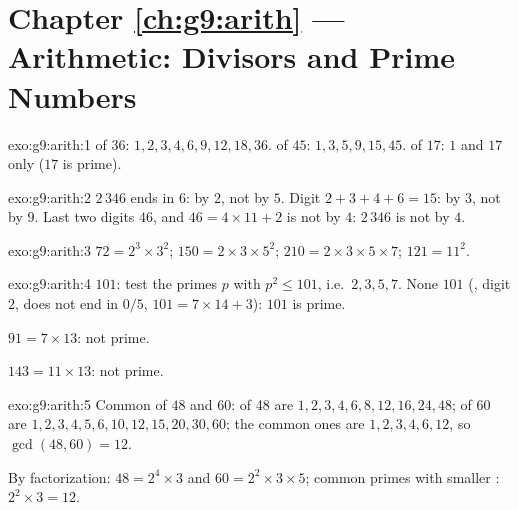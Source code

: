 \section*{Chapter \ref{ch:g9:arith} --- Arithmetic: Divisors and Prime Numbers}

\begin{solution}{exo:g9:arith:1}
 of $36$: $1, 2, 3, 4, 6, 9, 12, 18, 36$.
 of $45$: $1, 3, 5, 9, 15, 45$.
 of $17$: $1$ and $17$ only ($17$ is prime).
\end{solution}

\begin{solution}{exo:g9:arith:2}
$2\,346$ ends in $6$:  by $2$, not by $5$. Digit 
$2 + 3 + 4 + 6 = 15$:  by $3$, not by $9$. Last two digits
$46$, and $46 = 4 \times 11 + 2$ is not  by $4$: $2\,346$ is
not  by $4$.
\end{solution}

\begin{solution}{exo:g9:arith:3}
$72 = 2^3 \times 3^2$; \quad
$150 = 2 \times 3 \times 5^2$; \quad
$210 = 2 \times 3 \times 5 \times 7$; \quad
$121 = 11^2$.
\end{solution}

\begin{solution}{exo:g9:arith:4}
$101$: test the primes $p$ with $p^2 \leq 101$, i.e.\ $2, 3, 5, 7$. None
 $101$ (, digit  $2$, does not end in $0/5$,
$101 = 7 \times 14 + 3$): $101$ is prime.

$91 = 7 \times 13$: not prime.

$143 = 11 \times 13$: not prime.
\end{solution}

\begin{solution}{exo:g9:arith:5}
Common  of $48$ and $60$:  of 48 are $1, 2, 3, 4, 6, 8,
12, 16, 24, 48$;  of $60$ are $1, 2, 3, 4, 5, 6, 10, 12, 15, 20,
30, 60$; the common ones are $1, 2, 3, 4, 6, 12$, so $\gcd(48,60) = 12$.

By factorization: $48 = 2^4 \times 3$ and $60 = 2^2 \times 3 \times 5$;
common primes with smaller : $2^2 \times 3 = 12$.
\end{solution}

